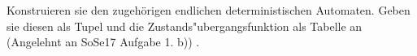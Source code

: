 \documentclass[a4paper,12pt]{article}
\begin{document}
\\
\\
Konstruieren sie den zugehörigen endlichen deterministischen Automaten.
Geben sie diesen als Tupel und die Zustands"ubergangsfunktion als Tabelle an (Angelehnt an SoSe17 Aufgabe 1. b)) .






\end{document}
